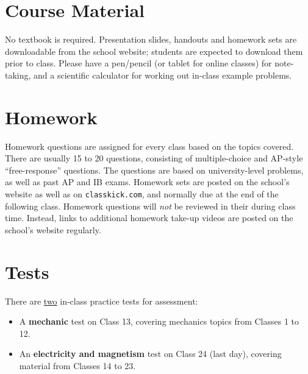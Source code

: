 \documentclass{../../oss-handout}
\begin{document}
\section{Course Material}
No textbook is required. Presentation slides, handouts and homework sets are
downloadable from the school website; students are expected to download them
prior to class. Please have a pen/pencil (or tablet for online classes) for
note-taking, and a scientific calculator for working out in-class example
problems.






\section{Homework}
Homework questions are assigned for every class based on the topics covered.
There are usually 15 to 20 questions, consisting of multiple-choice and
AP-style ``free-response'' questions. The questions are based on
university-level problems, as well as past AP and IB exams. Homework sets are
posted on the school's website as well as on \texttt{classkick.com}, and
normally due at the end of the following class. Homework questions will
\emph{not} be reviewed in their during class time. Instead, links to additional
homework take-up videos are posted on the school's website regularly.


\section{Tests}
There are \underline{two} in-class practice tests for assessment:
\begin{itemize}[nosep]
\item A \textbf{mechanic} test on Class 13, covering mechanics topics from
  Classes 1 to 12.
\item An \textbf{electricity and magnetism} test on Class 24 (last day),
  covering material from Classes 14 to 23.
\end{itemize}
\end{document}
